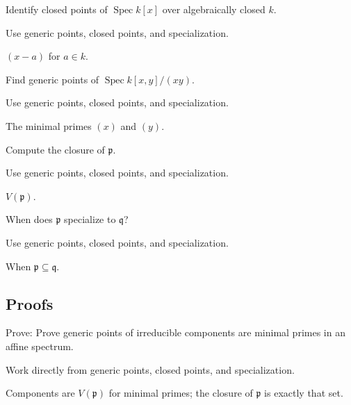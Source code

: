 \begin{exercise}\label{exr:vi09-expand-02}
Identify closed points of $\operatorname{Spec}k[x]$ over algebraically closed $k$.
\end{exercise}
\begin{hint}
Use generic points, closed points, and specialization.
\end{hint}
\begin{solution}
$(x-a)$ for $a\in k$.
\end{solution}

\begin{exercise}\label{exr:vi09-expand-03}
Find generic points of $\operatorname{Spec}k[x,y]/(xy)$.
\end{exercise}
\begin{hint}
Use generic points, closed points, and specialization.
\end{hint}
\begin{solution}
The minimal primes $(x)$ and $(y)$.
\end{solution}

\begin{exercise}[Closure]\label{exr:vi09-expand-04}
Compute the closure of $\mathfrak p$.
\end{exercise}
\begin{hint}
Use generic points, closed points, and specialization.
\end{hint}
\begin{solution}
$V(\mathfrak p)$.
\end{solution}

\begin{exercise}[Specialization]\label{exr:vi09-expand-05}
When does $\mathfrak p$ specialize to $\mathfrak q$?
\end{exercise}
\begin{hint}
Use generic points, closed points, and specialization.
\end{hint}
\begin{solution}
When $\mathfrak p\subseteq\mathfrak q$.
\end{solution}

\subsection*{Proofs}

\begin{exercise}\label{exr:vi09-expand-06}
Prove: Prove generic points of irreducible components are minimal primes in an affine spectrum.
\end{exercise}
\begin{hint}
Work directly from generic points, closed points, and specialization.
\end{hint}
\begin{solution}
Components are $V(\mathfrak p)$ for minimal primes; the closure of $\mathfrak p$ is exactly that set.
\end{solution}

